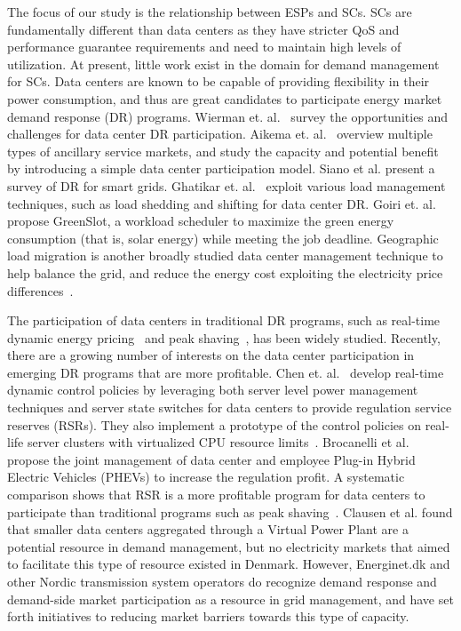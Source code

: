The focus of our study is the relationship between ESPs and SCs. SCs are fundamentally different than data centers as they have stricter QoS and performance guarantee requirements and need to maintain high levels of utilization. At present, little work exist in the domain for demand management for SCs.  Data centers are known to be capable of providing flexibility in their power consumption, and thus are great candidates to participate energy market demand response (DR) programs. Wierman et. al.~\cite{WiermanIGCC} survey the opportunities and challenges for data center DR participation. Aikema et. al.~\cite{aikema2012data} overview multiple types of ancillary service markets, and study the capacity and potential benefit by introducing a simple data center participation model. Siano et al. \cite{siano2014demand} present a survey of DR for smart grids. Ghatikar et. al.~\cite{ghatikar2012demand} exploit various load management techniques, such as load shedding and shifting for data center DR. Goiri et. al.~\cite{goiri2015matching} propose GreenSlot, a workload scheduler to maximize the green energy consumption (that is, solar energy) while meeting the job deadline. Geographic load migration is another broadly studied data center management technique to help balance the grid, and reduce the energy cost exploiting the electricity price differences~\cite{wangexploring,wang2013data,chiu2012electric,liu2011greening,lin2012online}.

The participation of data centers in traditional DR programs, such as real-time dynamic energy pricing~\cite{wang2013sequential,ghamkhari2012data,liu2014pricing} and peak shaving~\cite{urgaonkar2011optimal,PSUSigmetrics12,aksanli2013architecting}, has been widely studied. Recently, there are a growing number of interests on the data center participation in emerging DR programs that are more profitable. Chen et. al.~\cite{chenASPDAC} develop real-time dynamic control policies by leveraging both server level power management techniques and server state switches for data centers to provide regulation service reserves (RSRs). They also implement a prototype of the control policies on real-life server clusters with virtualized CPU resource limits~\cite{chendynamic}. Brocanelli et al.~\cite{brocanelli2013joint} propose the joint management of data center and employee Plug-in Hybrid Electric Vehicles (PHEVs) to increase the regulation profit. A systematic comparison shows that RSR is a more profitable program for data centers to participate than traditional programs such as peak shaving~\cite{chenIGCC}. Clausen et al. \cite{clausen2014load} found that smaller data centers aggregated through a Virtual Power Plant are a potential resource in demand management, but no electricity markets that aimed to facilitate this type of resource existed in Denmark. However, Energinet.dk and other Nordic transmission system operators do recognize demand response and demand-side market participation as a resource in grid management, and have set forth initiatives to reducing market barriers towards this type of capacity.  

